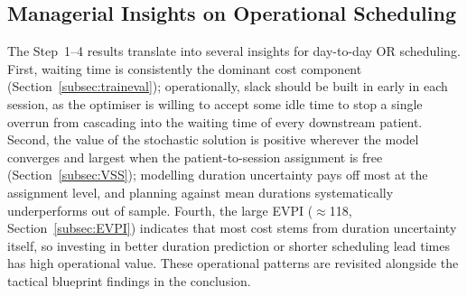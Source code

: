 \subsection{Managerial Insights on Operational Scheduling}
\label{subsec:operational_insights}
The Step~1--4 results translate into several insights for day-to-day OR
scheduling. First, waiting time is consistently the dominant cost component
(Section~\ref{subsec:traineval}); operationally, slack should be built in early
in each session, as the optimiser is willing to accept some idle time to stop a
single overrun from cascading into the waiting time of every downstream patient.
Second, the value of the
stochastic solution is positive wherever the model converges and largest when
the patient-to-session assignment is free
(Section~\ref{subsec:VSS}); modelling duration uncertainty pays off most at the
assignment level, and planning against mean durations systematically
underperforms out of sample. Fourth, the large EVPI ($\approx$118,
Section~\ref{subsec:EVPI}) indicates that most cost stems from duration
uncertainty itself, so investing in better duration prediction or shorter
scheduling lead times has high operational value. These operational patterns are
revisited alongside the tactical blueprint findings in the conclusion.